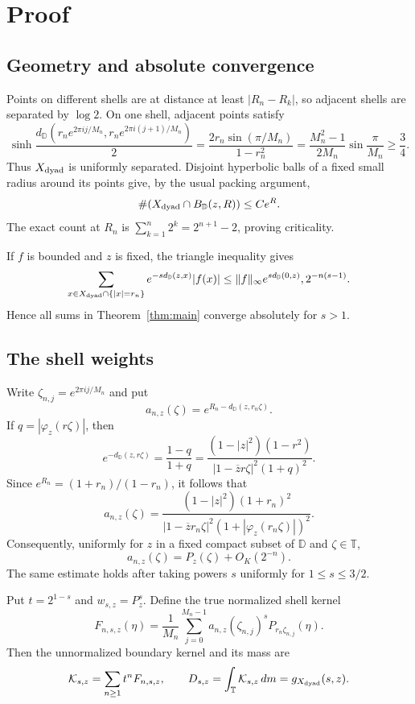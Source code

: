 \documentclass[11pt]{article}
\newcommand{\D}{\mathbb D}
\newcommand{\T}{\mathbb T}
\newcommand{\dm}{\,dm}
\begin{document}
\section{Proof}

\subsection{Geometry and absolute convergence}

Points on different shells are at distance at least $|R_n-R_k|$, so adjacent
shells are separated by $\log2$.  On one shell, adjacent points satisfy
\[
 \sinh\frac{d_\D(r_ne^{2\pi i j/M_n},r_ne^{2\pi i(j+1)/M_n})}{2}
 =\frac{2r_n\sin(\pi/M_n)}{1-r_n^2}
 =\frac{M_n^2-1}{2M_n}\sin\frac{\pi}{M_n}\ge\frac34.
\]
Thus $X_{\rm dyad}$ is uniformly separated.  Disjoint hyperbolic balls of a
fixed small radius around its points give, by the usual packing argument,
\[
 \#(X_{\rm dyad}\cap B_\D(z,R))\le C e^R.
\]
The exact count at $R_n$ is $\sum_{k=1}^n2^k=2^{n+1}-2$, proving criticality.

If $f$ is bounded and $z$ is fixed, the triangle inequality gives
\[
 \sum_{x\in X_{\rm dyad}\cap\{|x|=r_n\}}
 e^{-sd_\D(z,x)}|f(x)|
 \le \|f\|_\infty e^{s d_\D(0,z)},2^{-n(s-1)}.
\]
Hence all sums in Theorem~\ref{thm:main} converge absolutely for $s>1$.

\subsection{The shell weights}

Write $\zeta_{n,j}=e^{2\pi i j/M_n}$ and put
\[
 a_{n,z}(\zeta)=e^{R_n-d_\D(z,r_n\zeta)}.
\]
If $q=|\varphi_z(r\zeta)|$, then
\[
 e^{-d_\D(z,r\zeta)}=\frac{1-q}{1+q}
 =\frac{(1-|z|^2)(1-r^2)}{|1-\overline z r\zeta|^2(1+q)^2}.
\]
Since $e^{R_n}=(1+r_n)/(1-r_n)$, it follows that
\begin{equation}\label{eq:weight-exact}
 a_{n,z}(\zeta)
 =\frac{(1-|z|^2)(1+r_n)^2}
 {|1-\overline z r_n\zeta|^2(1+|\varphi_z(r_n\zeta)|)^2}.
\end{equation}
Consequently, uniformly for $z$ in a fixed compact subset of $\D$ and
$\zeta\in\T$,
\begin{equation}\label{eq:busemann}
 a_{n,z}(\zeta)=P_z(\zeta)+O_K(2^{-n}).
\end{equation}
The same estimate holds after taking powers $s$ uniformly for
$1\le s\le 3/2$.

Put $t=2^{1-s}$ and $w_{s,z}=P_z^s$.  Define the true normalized shell
kernel
\[
 F_{n,s,z}(\eta)=\frac1{M_n}\sum_{j=0}^{M_n-1}
 a_{n,z}(\zeta_{n,j})^s P_{r_n\zeta_{n,j}}(\eta).
\]
Then the unnormalized boundary kernel and its mass are
\begin{equation}\label{eq:boundarykernel}
 \mathcal K_{s,z}=\sum_{n\ge1}t^nF_{n,s,z},
 \qquad
 D_{s,z}=\int_\T\mathcal K_{s,z}\dm
 =g_{X_{\rm dyad}}(s,z).
\end{equation}
\end{document}
